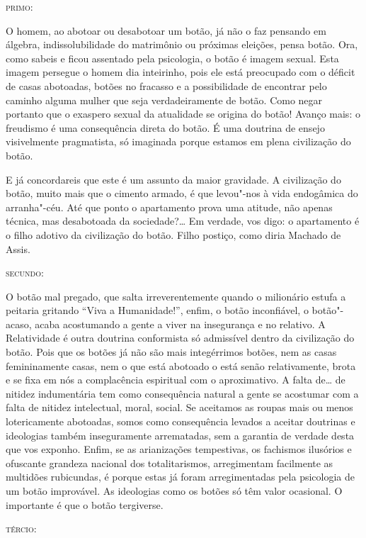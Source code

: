 \textsc{primo}:

O homem, ao abotoar ou desabotoar um botão, já não o faz pensando em
álgebra, indissolubilidade do matrimônio ou próximas eleições, pensa
botão. Ora, como sabeis e ficou assentado pela psicologia, o botão é
imagem sexual. Esta imagem persegue o homem dia inteirinho, pois ele
está preocupado com o déficit de casas abotoadas, botões no fracasso e a
possibilidade de encontrar pelo caminho alguma mulher que seja
verdadeiramente de botão. Como negar portanto que o exaspero sexual da
atualidade se origina do botão! Avanço mais: o freudismo é uma
consequência direta do botão. É uma doutrina de ensejo visivelmente
pragmatista, só imaginada porque estamos em plena civilização do botão.

E já concordareis que este é um assunto da maior gravidade. A
civilização do botão, muito mais que o cimento armado, é que levou"-nos à
vida endogâmica do arranha"-céu. Até que ponto o apartamento prova uma
atitude, não apenas técnica, mas desabotoada da sociedade?\ldots{} Em
verdade, vos digo: o apartamento é o filho adotivo da civilização do
botão. Filho postiço, como diria Machado de Assis.

\textsc{secundo}:

O botão mal pregado, que salta irreverentemente quando o milionário
estufa a peitaria gritando ``Viva a Humanidade!'', enfim, o botão
inconfiável, o botão"-acaso, acaba acostumando a gente a viver na
insegurança e no relativo. A Relatividade é outra doutrina conformista
só admissível dentro da civilização do botão. Pois que os botões já não
são mais integérrimos botões, nem as casas femininamente casas, nem o
que está abotoado o está senão relativamente, brota e se fixa em nós a
complacência espiritual com o aproximativo. A falta de\ldots{} de nitidez
indumentária tem como consequência natural a gente se acostumar com a
falta de nitidez intelectual, moral, social. Se aceitamos as roupas mais
ou menos lotericamente abotoadas, somos como consequência levados a
aceitar doutrinas e ideologias também inseguramente arrematadas, sem a
garantia de verdade desta que vos exponho. Enfim, se as arianizações
tempestivas, os fachismos ilusórios e ofuscante grandeza nacional dos
totalitarismos, arregimentam facilmente as multidões rubicundas, é
porque estas já foram arregimentadas pela psicologia de um botão
improvável. As ideologias como os botões só têm valor ocasional. O
importante é que o botão tergiverse.

\textsc{tércio}:

